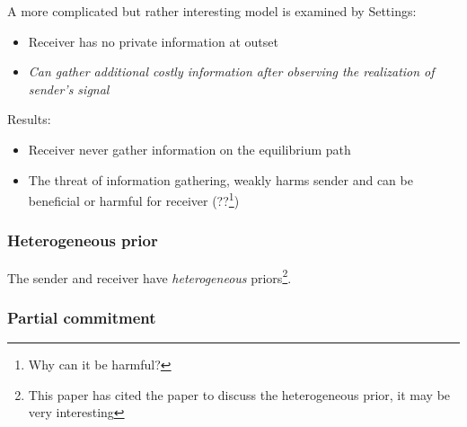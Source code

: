 \documentclass[12pt,letterpaper]{article}
\theoremstyle{definition}   %
\begin{document}
A more complicated but rather interesting model is examined by \cite{matyskova2018bayesian}
Settings:
\begin{itemize}
	\item Receiver has no private information at outset
	\item \emph{Can gather additional costly information after observing the realization of sender's signal}
\end{itemize}
Results:
\begin{itemize}
	\item Receiver never gather information on the equilibrium path
	\item The threat of information gathering, weakly harms sender and can be beneficial or harmful for receiver (??\footnote{Why can it be harmful?})
\end{itemize}

\subsubsection*{Heterogeneous prior}

\cite{alonso2016bayesian}
The sender and receiver have \emph{heterogeneous} priors\footnote{This paper has cited the paper \cite{aumann1966game} to discuss the heterogeneous prior, it may be very interesting}.



\subsubsection*{Partial commitment}

\cite{min2020bayesian, frechette2019rules, lipnowski2019persuasion, eilat2021communication} 





\end{document}
